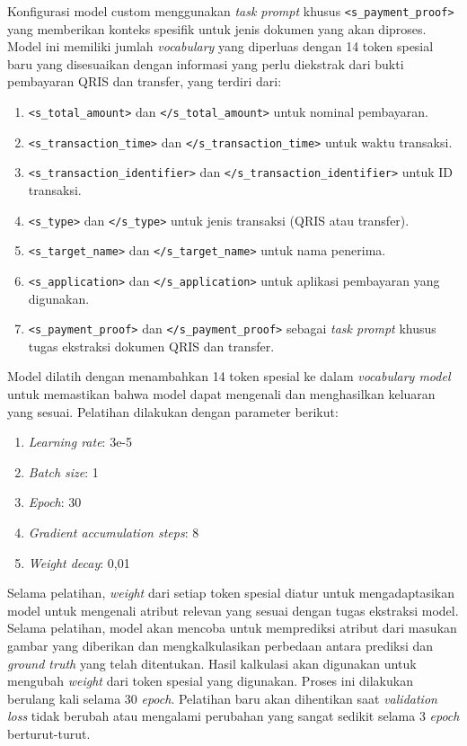 Konfigurasi model custom menggunakan \emph{task prompt} khusus \texttt{<s\_payment\_proof>} yang memberikan konteks spesifik untuk jenis dokumen yang akan diproses. Model ini memiliki jumlah \emph{vocabulary} yang diperluas dengan 14 token spesial baru yang disesuaikan dengan informasi yang perlu diekstrak dari bukti pembayaran QRIS dan transfer, yang terdiri dari:
\begin{enumerate}
    \item \texttt{<s\_total\_amount>} dan \texttt{</s\_total\_amount>} untuk nominal pembayaran.
    \item \texttt{<s\_transaction\_time>} dan \texttt{</s\_transaction\_time>} untuk waktu transaksi.
    \item \texttt{<s\_transaction\_identifier>} dan \texttt{</s\_transaction\_identifier>} untuk ID transaksi.
    \item \texttt{<s\_type>} dan \texttt{</s\_type>} untuk jenis transaksi (QRIS atau transfer).
    \item \texttt{<s\_target\_name>} dan \texttt{</s\_target\_name>} untuk nama penerima.
    \item \texttt{<s\_application>} dan \texttt{</s\_application>} untuk aplikasi pembayaran yang digunakan.
    \item \texttt{<s\_payment\_proof>} dan \texttt{</s\_payment\_proof>} sebagai \emph{task prompt} khusus tugas ekstraksi dokumen QRIS dan transfer.
\end{enumerate}

Model dilatih dengan menambahkan 14 token spesial ke dalam \emph{vocabulary model} untuk memastikan bahwa model dapat mengenali dan menghasilkan keluaran yang sesuai. Pelatihan dilakukan dengan parameter berikut:
\begin{enumerate}
\item \emph{Learning rate}: 3e-5
\item \emph{Batch size}: 1
\item \emph{Epoch}: 30
\item \emph{Gradient accumulation steps}: 8
\item \emph{Weight decay}: 0,01
\end{enumerate}

Selama pelatihan, \emph{weight} dari setiap token spesial diatur untuk mengadaptasikan model untuk mengenali atribut relevan yang sesuai dengan tugas ekstraksi model. Selama pelatihan, model akan mencoba untuk memprediksi atribut dari masukan gambar yang diberikan dan mengkalkulasikan perbedaan antara prediksi dan \emph{ground truth} yang telah ditentukan. Hasil kalkulasi akan digunakan untuk mengubah \emph{weight} dari token spesial yang digunakan. Proses ini dilakukan berulang kali selama 30 \emph{epoch}. Pelatihan baru akan dihentikan saat \emph{validation loss} tidak berubah atau mengalami perubahan yang sangat sedikit selama 3 \emph{epoch} berturut-turut.

